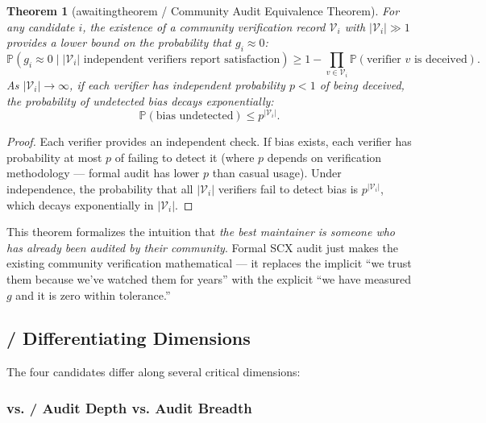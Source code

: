 \documentclass[12pt,a4paper]{article}
\newtheorem{theorem}{Theorem}[section]
\theoremstyle{remark}
\newcommand{\Pbb}{\mathbb{P}}
\newcommand{\biasParam}{g}
\begin{document}
\begin{theorem}[awaitingtheorem / Community Audit Equivalence Theorem]
\label{thm:community-audit}
For any candidate $i$, the existence of a community verification record
$\mathcal{V}_i$ with $|\mathcal{V}_i| \gg 1$ provides a lower bound on the
probability that $\biasParam_i \approx 0$:
\begin{equation}
    \Pbb(\biasParam_i \approx 0 \mid |\mathcal{V}_i| \text{ independent
    verifiers report satisfaction}) \geq 1 - \prod_{v \in \mathcal{V}_i}
    \Pbb(\text{verifier } v \text{ is deceived}).
\end{equation}
As $|\mathcal{V}_i| \to \infty$, if each verifier has independent
probability $p < 1$ of being deceived, the probability of undetected
bias decays exponentially:
\begin{equation}
    \Pbb(\text{bias undetected}) \leq p^{|\mathcal{V}_i|}.
\end{equation}
\end{theorem}

\begin{proof}
Each verifier provides an independent check. If bias exists, each verifier
has probability at most $p$ of failing to detect it (where $p$ depends on
verification methodology — formal audit has lower $p$ than casual usage).
Under independence, the probability that all $|\mathcal{V}_i|$ verifiers
fail to detect bias is $p^{|\mathcal{V}_i|}$, which decays exponentially
in $|\mathcal{V}_i|$.
\end{proof}

This theorem formalizes the intuition that \textit{the best maintainer is
someone who has already been audited by their community}. Formal SCX audit
just makes the existing community verification mathematical — it replaces
the implicit ``we trust them because we've watched them for years'' with
the explicit ``we have measured $g$ and it is zero within tolerance.''

\subsection{ / Differentiating Dimensions}

The four candidates differ along several critical dimensions:

\subsubsection{ vs.  / Audit Depth vs. Audit Breadth}
\end{document}
